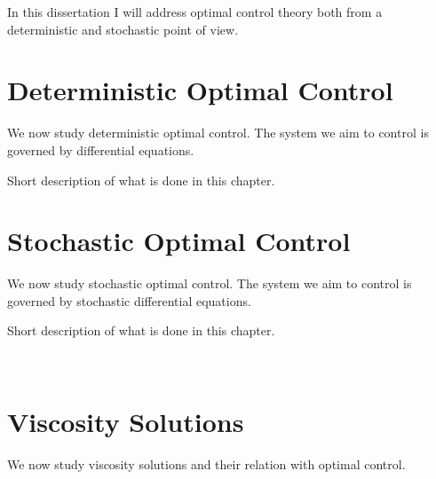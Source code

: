 \documentclass[12pt,a4paper]{book}
\numberwithin{theorem}{section}
\numberwithin{definition}{section}
\numberwithin{example}{section}
\numberwithin{exercise}{section}
\begin{document}
In this dissertation I will address optimal control theory both from a deterministic and stochastic point of view. 

\newpage

{\hypersetup{linkbordercolor=black, hidelinks}
\tableofcontents
}


\hypersetup{colorlinks, linkcolor = gray, citecolor = gray, hidelinks}

\newpage

\chapter{Deterministic Optimal Control}

We now study deterministic optimal control. The system we aim to control is governed by differential equations. 

Short description of what is done in this chapter.













\newpage

\chapter{Stochastic Optimal Control}

We now study stochastic optimal control. The system we aim to control is governed by stochastic differential equations. 

Short description of what is done in this chapter.

\





\newpage

\chapter{Viscosity Solutions}

We now study viscosity solutions and their relation with optimal control.



\newpage

\nocite{*}
\printbibliography
{}

\end{document}
